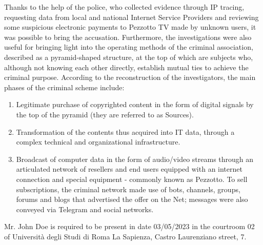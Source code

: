 \documentclass{article}
\begin{document}
Thanks to the help of the police, who collected evidence through IP tracing, requesting data 
from local and national Internet Service Providers and reviewing some suspicious electronic 
payments to Pezzotto TV made by unknown users, it was possible to bring the accusation. 
Furthermore, the investigations were also useful for bringing light into the operating 
methods of the criminal association, described as a pyramid-shaped structure, at the 
top of which are subjects who, although not knowing each other directly, establish mutual 
ties to achieve the criminal purpose. According to the reconstruction of the investigators, 
the main phases of the criminal scheme include:
\begin{enumerate}
  \item Legitimate purchase of copyrighted content in the form of digital signals by the top of the
        pyramid (they are referred to as Sources).
  \item Transformation of the contents thus acquired into IT data, through a complex technical 
        and organizational infrastructure.
  \item Broadcast of computer data in the form of audio/video streams through an articulated 
        network of resellers and end users equipped with an internet connection and special 
        equipment - commonly known as Pezzotto. To sell subscriptions, the criminal 
        network made use of bots, channels, groups, forums and blogs that
        advertised the offer on the Net; messages were also conveyed via Telegram and social networks.
\end{enumerate}

\hfill \break
Mr. John Doe is required to be present in date 03/05/2023 in the courtroom 02 of Università degli Studi di Roma La Sapienza, Castro Laurenziano street, 7.
\end{document}
